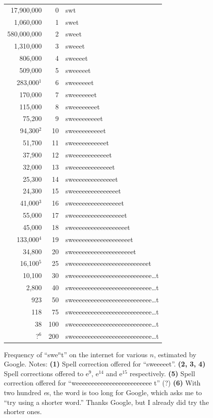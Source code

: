 \documentclass[twocolumn]{article}
\begin{document}
\begin{figure}
\begin{tabular}{r|r|l}
17,900,000 & 0 & swt \\
1,060,000 & 1 & swet \\
580,000,000 & 2 & sweet \\
1,310,000 & 3 & sweeet \\
806,000 & 4 & sweeeet \\
509,000 & 5 & sweeeeet \\
283,000$^1$ & 6 & sweeeeeet \\  %
170,000 & 7 & sweeeeeeet \\
115,000 & 8 & sweeeeeeeet \\
75,200 & 9 &  sweeeeeeeeet \\
94,300$^2$ & 10 & sweeeeeeeeeet \\ %
51,700 & 11 & sweeeeeeeeeeet \\
37,900 & 12 & sweeeeeeeeeeeet \\
32,000 & 13 & sweeeeeeeeeeeeet \\
25,300 & 14 & sweeeeeeeeeeeeeet \\
24,300 & 15 & sweeeeeeeeeeeeeeet \\
41,000$^3$ & 16 & sweeeeeeeeeeeeeeeet \\ %
55,000 & 17 & sweeeeeeeeeeeeeeeeet \\
45,000 & 18 & sweeeeeeeeeeeeeeeeeet \\
133,000$^4$ & 19 & sweeeeeeeeeeeeeeeeeeet \\ %
34,800 & 20 &  sweeeeeeeeeeeeeeeeeeeet \\
%
16,100$^5$ & 25 & sweeeeeeeeeeeeeeeeeeeeeeeeet \\ %
10,100 & 30 & sweeeeeeeeeeeeeeeeeeeeeeeeee\ldots t \\
2,800 & 40 &  sweeeeeeeeeeeeeeeeeeeeeeeeee\ldots t \\
923 & 50 &    sweeeeeeeeeeeeeeeeeeeeeeeeee\ldots t \\
118 & 75 &    sweeeeeeeeeeeeeeeeeeeeeeeeee\ldots t \\
38 & 100 &    sweeeeeeeeeeeeeeeeeeeeeeeeee\ldots t  \\
?$^6$ & 200 & sweeeeeeeeeeeeeeeeeeeeeeeeee\ldots t     \\ %
\end{tabular}
\caption{Frequency of ``swe$^n$t'' on the internet for various $n$, estimated
by Google. Notes: {\bf (1)} Spell correction offered for ``sweeeeet''. {\bf (2, 3, 4)} Spell corrections
offered to e$^{9}$, e$^{14}$ and e$^{15}$ respectively. {\bf (5)} Spell correction offered for ``weeeeeeeeeeeeeeeeeeeeeeeee t'' (?) {\bf (6)} With two hundred {\it e}s, the word is too long for Google, which asks me to ``try using a shorter word.'' Thanks Google, but I already did try the shorter ones.}
\label{fig:sweet}
\end{figure}
\end{document}
